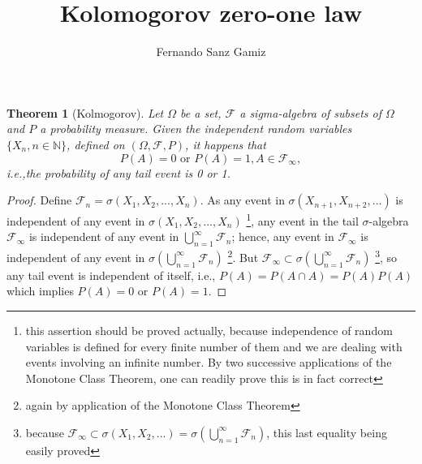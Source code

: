 \documentclass[12pt]{article}
\newtheorem*{thm}{Theorem}
\theoremstyle{remark}
\numberwithin{equation}{section}
\newcommand{\N}{\mathbb N}
\newcommand{\F}{\mathcal F}
\begin{document}
\title{Kolomogorov zero-one law}%
\author{Fernando Sanz Gamiz}%

\begin{thm}[Kolmogorov]
Let $\Omega$ be a set, $\F$ a sigma-algebra of subsets of $\Omega$
and $P$ a probability measure. Given the independent random
variables $\{X_n, n \in \N\}$, defined on $(\Omega,\F, P)$, it
happens that $$P(A)=0 \mbox{ or } P(A)=1, A \in \F_{\infty},$$
i.e.,the probability of any tail event is 0 or 1.
\end{thm}

\medskip

\begin{proof}
Define $\F_n = \sigma(X_1,X_2,...,X_n)$. As any event in
$\sigma(X_{n+1},X_{n+2},...)$ is independent of any event in
$\sigma(X_1,X_2,...,X_n)$ \footnote{this assertion should be proved
actually, because independence of random variables is defined for
every finite number of them and we are dealing with events involving
an infinite number. By two successive applications of the Monotone
Class Theorem, one can readily prove this is in fact correct}, any
event in the tail $\sigma$-algebra $\F_{\infty}$ is independent of
any event in $\bigcup_{n=1}^{\infty} \F_n$; hence, any event in
$\F_{\infty}$ is independent of any event in
$\sigma(\bigcup_{n=1}^{\infty} \F_n)$ \footnote{again by application
of the Monotone Class Theorem}. But $\F_{\infty} \subset
\sigma(\bigcup_{n=1}^{\infty} \F_n)$ \footnote{because $\F_{\infty}
\subset \sigma(X_1,X_2,...)=\sigma(\bigcup_{n=1}^{\infty} \F_n)$,
this last equality being easily proved}, so any tail event is
independent of itself, i.e., $P(A)=P(A\cap A)=P(A)P(A)$ which
implies $P(A)=0$ or $P(A)=1$.
\end{proof}
\end{document}
